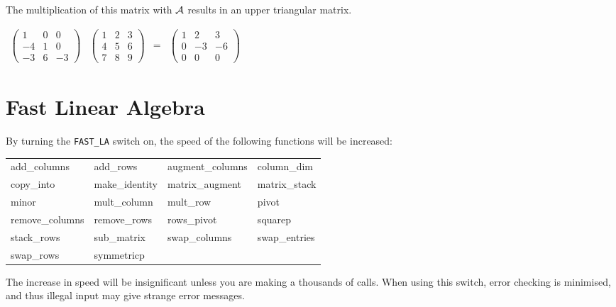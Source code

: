 The multiplication of this matrix with ${\cal A}$ results in an upper triangular matrix.

\begin{flushleft}  
\hspace*{0.1in}
\begin{math}  
\begin{array}{cccc}
 \left( \begin{array}{ccc} 1 & 0 & 0 \\ -4 & 1 & 0 \\ -3 & 6 & -3 
 \end{array} \right) &
 \left( \begin{array}{ccc} 1 & 2 & 3 \\ 4 & 5 & 6 \\ 7 & 8 & 9 
 \end{array} \right)
 & = & 
        \left( \begin{array}{ccc} 1 & 2 & 3 \\ 0 & -3 & -6 \\ 0 & 0 & 0 
 \end{array} \right) 
\end{array}
\end{math}  
\end{flushleft}

\section{Fast Linear Algebra}

By turning the {\tt FAST\_LA} switch on, the speed
of the following functions will be increased:

\begin{tabular}{l l l l}
   add\_columns    & add\_rows      & augment\_columns & column\_dim  \\
   copy\_into      & make\_identity & matrix\_augment  & matrix\_stack\\
   minor           & mult\_column   &  mult\_row       & pivot        \\
   remove\_columns & remove\_rows   & rows\_pivot      & squarep      \\
   stack\_rows     & sub\_matrix    & swap\_columns    & swap\_entries\\
   swap\_rows      & symmetricp                                     
\end{tabular}

The increase in speed will be insignificant unless you are making a 
thousands of calls.  When using this switch, 
error checking is minimised, and thus illegal input may give strange
error messages.

